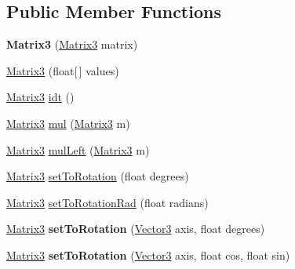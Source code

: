 \subsection*{Public Member Functions}
\begin{DoxyCompactItemize}
\item 
\hypertarget{classairhockeyjava_1_1util_1_1_matrix3_a28bcb864154f1ead0aec130f6a45bf1f}{}{\bfseries Matrix3} (\hyperlink{classairhockeyjava_1_1util_1_1_matrix3}{Matrix3} matrix)\label{classairhockeyjava_1_1util_1_1_matrix3_a28bcb864154f1ead0aec130f6a45bf1f}

\item 
\hyperlink{classairhockeyjava_1_1util_1_1_matrix3_acedbc8cbd28ef8cdca742b38b1470fed}{Matrix3} (float\mbox{[}$\,$\mbox{]} values)
\item 
\hyperlink{classairhockeyjava_1_1util_1_1_matrix3}{Matrix3} \hyperlink{classairhockeyjava_1_1util_1_1_matrix3_a974da1a841386a0779bfabaa5977f5ed}{idt} ()
\item 
\hyperlink{classairhockeyjava_1_1util_1_1_matrix3}{Matrix3} \hyperlink{classairhockeyjava_1_1util_1_1_matrix3_a531cca5cf7d07429238f080099fd5921}{mul} (\hyperlink{classairhockeyjava_1_1util_1_1_matrix3}{Matrix3} m)
\item 
\hyperlink{classairhockeyjava_1_1util_1_1_matrix3}{Matrix3} \hyperlink{classairhockeyjava_1_1util_1_1_matrix3_a053d27c9c4984e463ffc007ee97fb2ec}{mul\+Left} (\hyperlink{classairhockeyjava_1_1util_1_1_matrix3}{Matrix3} m)
\item 
\hyperlink{classairhockeyjava_1_1util_1_1_matrix3}{Matrix3} \hyperlink{classairhockeyjava_1_1util_1_1_matrix3_aff2291982c44de3aaa81097efcbe232e}{set\+To\+Rotation} (float degrees)
\item 
\hyperlink{classairhockeyjava_1_1util_1_1_matrix3}{Matrix3} \hyperlink{classairhockeyjava_1_1util_1_1_matrix3_a25365497da8685d0f9b58095baabe918}{set\+To\+Rotation\+Rad} (float radians)
\item 
\hypertarget{classairhockeyjava_1_1util_1_1_matrix3_a7929ab05b924c0f24cd13846aa5a77f2}{}\hyperlink{classairhockeyjava_1_1util_1_1_matrix3}{Matrix3} {\bfseries set\+To\+Rotation} (\hyperlink{classairhockeyjava_1_1util_1_1_vector3}{Vector3} axis, float degrees)\label{classairhockeyjava_1_1util_1_1_matrix3_a7929ab05b924c0f24cd13846aa5a77f2}

\item 
\hypertarget{classairhockeyjava_1_1util_1_1_matrix3_ae15ba152c691572e7c293b801c4f2e65}{}\hyperlink{classairhockeyjava_1_1util_1_1_matrix3}{Matrix3} {\bfseries set\+To\+Rotation} (\hyperlink{classairhockeyjava_1_1util_1_1_vector3}{Vector3} axis, float cos, float sin)\label{classairhockeyjava_1_1util_1_1_matrix3_ae15ba152c691572e7c293b801c4f2e65}


\end{DoxyCompactItemize}
